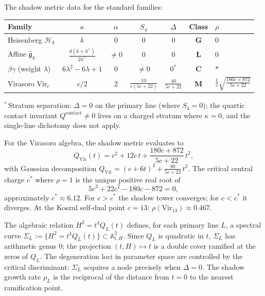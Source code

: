 \begin{example}
\label{ex:standard-families}
The shadow metric data for the standard families:
\begin{center}
\small
\renewcommand{\arraystretch}{1.3}
\begin{tabular}{lcccccl}
\toprule
Family & $\kappa$ & $\alpha$ & $S_4$ & $\Delta$ & Class
 & $\rho$ \\
\midrule
Heisenberg $\mathcal{H}_k$ & $k$ & $0$ & $0$ & $0$
 & $\mathbf{G}$ & $0$ \\
Affine $\widehat{\mathfrak{g}}_k$
 & $\frac{d(k+h^\vee)}{2h^\vee}$ & $\neq 0$ & $0$
 & $0$ & $\mathbf{L}$ & $0$ \\
$\beta\gamma$ (weight $\lambda$) & $6\lambda^2{-}6\lambda{+}1$ & $0$ & $\neq 0$ & $0^*$
 & $\mathbf{C}$ & $*$ \\
Virasoro $\mathrm{Vir}_c$ & $c/2$ & $2$
 & $\frac{10}{c(5c+22)}$ & $\frac{40}{5c+22}$
 & $\mathbf{M}$ & $\frac{1}{c}\sqrt{\frac{180c+872}{5c+22}}$ \\
\bottomrule
\end{tabular}
\end{center}
\vspace{2pt}
\noindent
${}^*$\,Stratum separation: $\Delta = 0$ on the primary line
(where $S_4 = 0$); the quartic contact invariant
$Q^{\mathrm{contact}} \neq 0$ lives on a charged stratum
where $\kappa = 0$, and the single-line dichotomy does not
apply.

For the Virasoro algebra, the shadow metric evaluates to
\[
 Q_{\mathrm{Vir}}(t) = c^2 + 12c\,t
 + \frac{180c + 872}{5c + 22}\,t^2,
\]
with Gaussian decomposition
$Q_{\mathrm{Vir}} = (c + 6t)^2 + \frac{80}{5c+22}\,t^2$.
The critical central charge $c^*$ where $\rho = 1$ is the
unique positive real root of
\[
 5c^3 + 22c^2 - 180c - 872 = 0,
\]
approximately $c^* \approx 6.12$. For $c > c^*$ the shadow
tower converges; for $c < c^*$ it diverges. At the Koszul
self-dual point $c = 13$: $\rho(\mathrm{Vir}_{13}) \approx 0.467$.
\end{example}

\begin{remark}
The algebraic relation $H^2 = t^4 Q_L(t)$ defines, for each
primary line $L$, a spectral curve
$\Sigma_L := \{H^2 = t^4 Q_L(t)\} \subset \mathbb{A}^2_{t,H}$.
Since $Q_L$ is quadratic in $t$, $\Sigma_L$ has arithmetic
genus $0$; the projection $(t,H) \mapsto t$ is a double cover
ramified at the zeros of $Q_L$. The degeneration loci in
parameter space are controlled by the critical discriminant:
$\Sigma_L$ acquires a node precisely when $\Delta = 0$.
The shadow growth rate $\rho_L$ is the reciprocal of the
distance from $t = 0$ to the nearest ramification point.
\end{remark}
